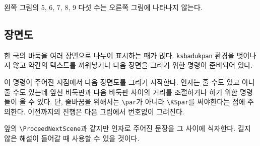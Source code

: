 \documentclass[figtabcapt,a4paper]{oblivoir}
\begin{document}
\ClearHistory

\noindent
\begin{boxedverbatim}
\begin{ksbadukpan}[badukpansize=6][U]
\end{ksbadukpan}
\hfill
\begin{ksbadukpan}[badukpansize=6][U]
\KSBadukContinue
\end{ksbadukpan}
\end{boxedverbatim}

\begin{ksbadukpan}[badukpansize=6][U]
\end{ksbadukpan}
\hfill
\begin{ksbadukpan}[badukpansize=6][U]
\KSBadukContinue
\end{ksbadukpan}

왼쪽 그림의 5, 6, 7, 8, 9 다섯 수는 오른쪽 그림에 나타나지 않는다.

\ClearHistory

\subsection{장면도}

한 국의 바둑을 여러 장면으로 나누어 표시하는 때가 많다. \texttt{ksbadukpan} 환경을 벗어나지
않고 약간의 텍스트를 끼워넣거나 다음 장면을 그리기 위한 명령이 준비되어 있다.

\begin{boxedverbatim}
\end{boxedverbatim}

이 명령이 주어진 시점에서 다음 장면도를 그리기 시작한다.
인자는 줄 수도 있고 아니 줄 수도 있는데 앞선 바둑판과 다음 바둑판 사이의 거리를 조절하거나 하기 위한 명령들이
올 수 있다. 단, 줄바꿈을 위해서는 \verb|\par|가 아니라 \verb|\KSpar|를 써야한다는 점에 주의한다.
이전까지의 진행은 다음 그림에서 번호없이 그려진다.

\begin{boxedverbatim}
\end{boxedverbatim}

앞의 \verb|\ProceedNextScene|과 같지만 인자로 주어진 문장을 그 사이에 식자한다.
길지 않은 해설이 들어갈 때 사용할 수 있을 것이다.
\end{document}
